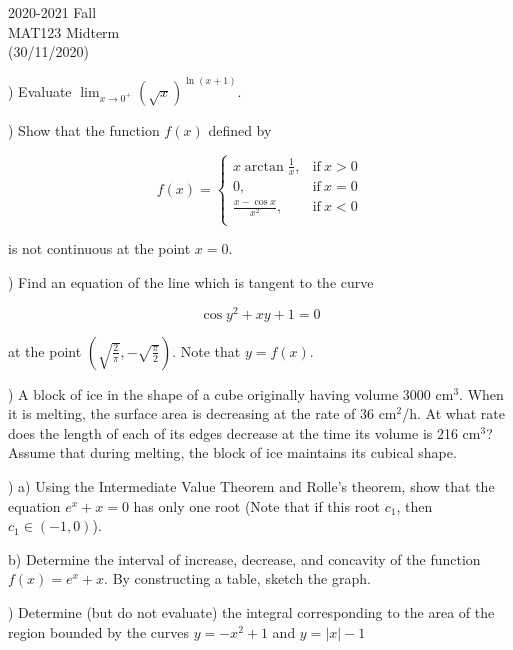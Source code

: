 \documentclass{article}
\begin{document}
\pagestyle{empty}
\large

\begin{center}
2020-2021 Fall\\MAT123 Midterm\\(30/11/2020)
\end{center}

) Evaluate $\displaystyle\lim_{x\to0^+} (\sqrt x)^{\ln(x+1)}$.

\hfill

) Show that the function $f(x)$ defined by

\[
 f(x) =
\begin{cases}
\displaystyle x\arctan\frac{1}{x}, & \text{if}\ x > 0 \\
0, & \text{if}\ x = 0 \\
\displaystyle \frac{x-\cos x}{x^2}, & \text{if}\ x < 0 \\
\end{cases}
\]

\noindent is not continuous at the point $x=0$.

\hfill

) Find an equation of the line which is tangent to the curve

\[
\cos y^2 + xy + 1= 0
\]

\noindent at the point $\displaystyle \left(\sqrt{\frac{2}{\pi}}, -\sqrt{\frac{\pi}{2}} \right)$. Note that $y=f(x)$.

\hfill

) A block of ice in the shape of a cube originally having volume 3000 cm$^3$. When it is melting, the surface area is decreasing at the rate of 36 cm$^2$/h. At what rate does the length of each of its edges decrease at the time its volume is 216 cm$^3$? Assume that during melting, the block of ice maintains its cubical shape.

\hfill

) a) Using the Intermediate Value Theorem and Rolle’s theorem, show that the equation $e^x + x = 0$ has only one root (Note that if this root $c_1$, then $c_1 \in (-1, 0)$).

\hfill

\noindent b) Determine the interval of increase, decrease, and concavity of the function $f(x) = e^x+x$. By constructing a table, sketch the graph.

\hfill

) Determine (but do not evaluate) the integral corresponding to the area of the region bounded by the curves $y = -x^2 + 1$ and $y = |x|- 1$
\end{document}
